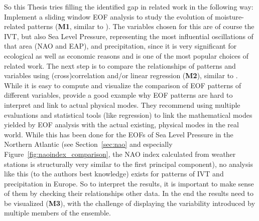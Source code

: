 So this Thesis tries filling the identified gap in related work in the following way: 
Implement a sliding window EOF analysis to study the evolution of moisture-related patterns (\textbf{M1}, similar to \cite{vietinghoffdiss, zou_interdecadal_2018}). 
The variables chosen for this are of course the IVT, but also Sea Level Pressure, representing the most influential oscillations of that area (NAO and EAP), and precipitation, since it is very significant for ecological as well as economic reasons and is one of the most popular choices of related work. 
The next step is to compare the relationships of patterns and variables using (cross)correlation and/or linear regression (\textbf{M2}), similar to \cite{zou_interdecadal_2018, zou_investigating_2020, yao_simulation_2013}. 
While it is easy to compute and visualize the comparison of EOF patterns of different variables,  provide a good example why EOF patterns are hard to interpret and link to actual physical modes. 
They recommend using multiple evaluations and statistical tools (like regression) to link the mathematical modes yielded by EOF analysis with the actual existing, physical modes in the real world. 
While this has been done for the EOFs of Sea Level Pressure in the Northern Atlantic (see Section~\ref{sec:nao} and especially Figure~\ref{fig:naoindex_comparison}, the NAO index calculated from weather stations is structurally very similar to the first principal component), no analysis like this (to the authors best knowledge) exists for patterns of IVT and precipitation in Europe.  
So to interpret the results, it is important to make sense of them by checking their relationships other data. 
In the end the results need to be visualized (\textbf{M3}), with the challenge of displaying the variability introduced by multiple members of the ensemble. 
